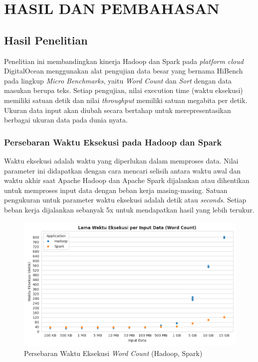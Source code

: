 \chapter{HASIL DAN PEMBAHASAN}

\section{Hasil Penelitian}
Penelitian ini membandingkan kinerja Hadoop dan Spark pada \textit{platform cloud} DigitalOcean menggunakan alat pengujian data besar yang bernama HiBench pada lingkup \textit{Micro Benchmarks}, yaitu \textit{Word Count} dan \textit{Sort} dengan data masukan berupa teks.
Setiap pengujian, nilai execution time (waktu eksekusi) memiliki satuan detik dan nilai \textit{throughput} memiliki satuan megabita per detik. Ukuran data input akan diubah secara bertahap untuk merepresentasikan berbagai ukuran data pada dunia nyata.

\subsection {Persebaran Waktu Eksekusi pada Hadoop dan Spark}
Waktu eksekusi adalah waktu yang diperlukan dalam memproses data. Nilai parameter ini didapatkan dengan cara mencari selisih antara waktu awal dan waktu akhir saat Apache Hadoop dan Apache Spark dijalankan atau dihentikan untuk memproses input data dengan beban kerja masing-masing. Satuan pengukuran untuk parameter waktu eksekusi adalah detik atau \textit{seconds}. Setiap beban kerja dijalankan sebanyak 5x untuk mendapatkan hasil yang lebih terukur. 

\begin{figure}[h]
    \centering
    \includegraphics[width=1\textwidth]{figures/ch04/1-lama-waktu-eksekusi-wordcount.png}
    \caption{Persebaran Waktu Eksekusi \textit{Word Count} (Hadoop, Spark)}
    \label{fig:lama-waktu-eksekusi-wordcount}
\end{figure}


